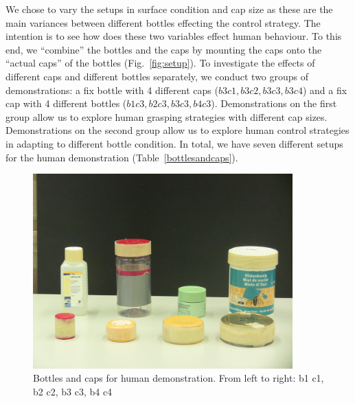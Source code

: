 We chose to vary the setups in surface condition and cap size as these are the main variances between different bottles effecting the control strategy. The intention is to see how does these two variables effect human behaviour. To this end, we ``combine'' the bottles and the caps by mounting the caps onto the ``actual caps'' of the bottles (Fig.~\ref{fig:setup}). To investigate the effects of different caps and different bottles separately, we conduct two groups of demonstrations: a fix bottle with 4 different caps ($b3c1, b3c2, b3c3, b3c4$) and a fix cap with 4 different bottles ($b1c3, b2c3, b3c3, b4c3$). Demonstrations on the first group allow us to explore human grasping strategies with different cap sizes. Demonstrations on the second group allow us to explore human control strategies in adapting to different bottle condition. In total, we have seven different setups for the human demonstration (Table~\ref{bottlesandcaps}).


\begin{figure}
  \centering
  \includegraphics[width=10cm]{./fig_cha4/b_c.jpg}
  \caption{ \scriptsize{Bottles and caps for human demonstration. From left to right: b1 c1, b2 c2, b3 c3, b4  c4}
}
\label{fig:b_c}
\end{figure}






